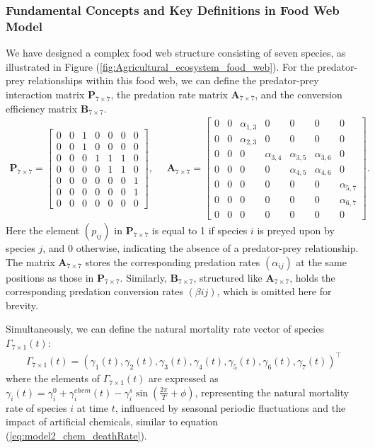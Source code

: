\documentclass{mcmthesis}
\begin{document}
\subsubsection{Fundamental Concepts and Key Definitions in Food Web Model}\label{sec:6.1.1}
We have designed a complex food web structure consisting of seven species, as illustrated in Figure (\ref{fig:Agricultural_ecosystem_food_web}). For the predator-prey relationships within this food web, we can define the predator-prey interaction matrix $\mathbf{P}_{7\times 7}$, the predation rate matrix $\mathbf{A}_{7\times 7}$, and the conversion efficiency matrix $\mathbf{B}_{7\times 7}$.
\begin{align}
\mathbf{P}_{7\times 7} = 
\begin{bmatrix}
0 & 0 & 1 & 0 & 0 & 0 & 0 \\
0 & 0 & 1 & 0 & 0 & 0 & 0 \\
0 & 0 & 0 & 1 & 1 & 1 & 0 \\
0 & 0 & 0 & 0 & 1 & 1 & 0 \\
0 & 0 & 0 & 0 & 0 & 0 & 1 \\
0 & 0 & 0 & 0 & 0 & 0 & 1 \\
0 & 0 & 0 & 0 & 0 & 0 & 0 
\end{bmatrix}, \quad \,\,
\mathbf{A}_{7\times7} =
\begin{bmatrix}
0 & 0 & \alpha_{1,3} & 0 & 0 & 0 & 0 \\
0 & 0 & \alpha_{2,3}  & 0 & 0 & 0 & 0 \\
0 & 0 & 0 & \alpha_{3,4} & \alpha_{3,5} & \alpha_{3,6} & 0 \\
0 & 0 & 0 & 0 & \alpha_{4,5} & \alpha_{4,6} & 0 \\
0 & 0 & 0 & 0 & 0 & 0 & \alpha_{5,7} \\
0 & 0 & 0 & 0 & 0 & 0 & \alpha_{6,7} \\
0 & 0 & 0 & 0 & 0 & 0 & 0 
\end{bmatrix}.
\end{align}
Here the element $(p_{ij})$ in $\mathbf{P}_{7\times7}$ is equal to 1 if species $i$ is preyed upon by species $j$, and 0 otherwise, indicating the absence of a predator-prey relationship. The matrix $\mathbf{A}_{7\times7}$ stores the corresponding predation rates $(\alpha_{ij})$ at the same positions as those in $\mathbf{P}_{7\times7}$. Similarly, $\mathbf{B}_{7\times7}$, structured like $\mathbf{A}_{7\times7}$, holds the corresponding predation conversion rates $(\beta{ij})$, which is omitted here for brevity.

Simultaneously, we can define the natural mortality rate vector of species $\Gamma_{7\times1}(t)$: 
\begin{align*}
    \Gamma_{7\times1}(t)= (\gamma_1(t), \gamma_2(t), \gamma_3(t), \gamma_4(t), \gamma_5(t), \gamma_6(t) ,\gamma_7(t))^\intercal
\end{align*}
where the elements of $\Gamma_{7\times1}(t)$ are expressed as $\gamma_i(t) = \gamma_i^0 + \gamma_i^{chem}(t) - \gamma_i^s \sin\left(\frac{2\pi}{T} + \phi\right)$, representing the natural mortality rate of species $i$ at time $t$, influenced by seasonal periodic fluctuations and the impact of artificial chemicals, similar to equation (\ref{eq:model2_chem_deathRate}).
\end{document}
